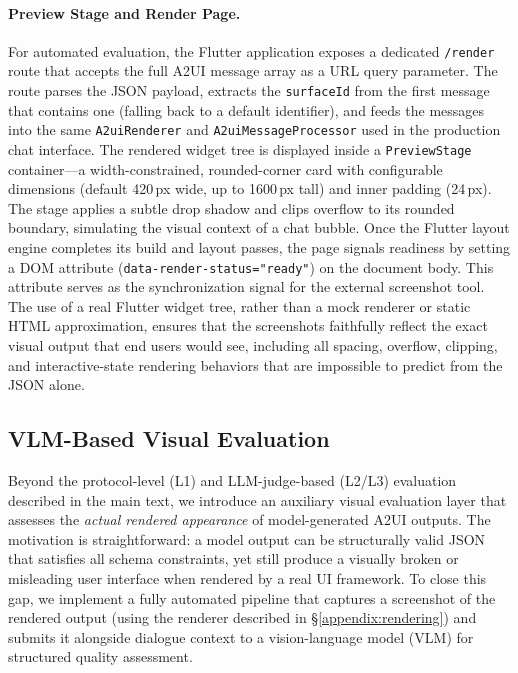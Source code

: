 \paragraph{Preview Stage and Render Page.}
For automated evaluation, the Flutter application exposes a dedicated \texttt{/render} route that accepts the full A2UI message array as a URL query parameter. The route parses the JSON payload, extracts the \texttt{surfaceId} from the first message that contains one (falling back to a default identifier), and feeds the messages into the same \texttt{A2uiRenderer} and \texttt{A2uiMessageProcessor} used in the production chat interface. The rendered widget tree is displayed inside a \texttt{PreviewStage} container---a width-constrained, rounded-corner card with configurable dimensions (default 420\,px wide, up to 1600\,px tall) and inner padding (24\,px). The stage applies a subtle drop shadow and clips overflow to its rounded boundary, simulating the visual context of a chat bubble. Once the Flutter layout engine completes its build and layout passes, the page signals readiness by setting a DOM attribute (\texttt{data-render-status="ready"}) on the document body. This attribute serves as the synchronization signal for the external screenshot tool. The use of a real Flutter widget tree, rather than a mock renderer or static HTML approximation, ensures that the screenshots faithfully reflect the exact visual output that end users would see, including all spacing, overflow, clipping, and interactive-state rendering behaviors that are impossible to predict from the JSON alone.


\subsection{VLM-Based Visual Evaluation}
\label{appendix:visual-eval}

Beyond the protocol-level (L1) and LLM-judge-based (L2/L3) evaluation described in the main text, we introduce an auxiliary visual evaluation layer that assesses the \emph{actual rendered appearance} of model-generated A2UI outputs. The motivation is straightforward: a model output can be structurally valid JSON that satisfies all schema constraints, yet still produce a visually broken or misleading user interface when rendered by a real UI framework. To close this gap, we implement a fully automated pipeline that captures a screenshot of the rendered output (using the renderer described in \S\ref{appendix:rendering}) and submits it alongside dialogue context to a vision-language model (VLM) for structured quality assessment.


